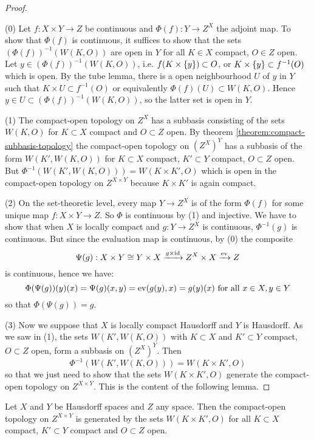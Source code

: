 \begin{proof}\ 

(0) Let $f:X\times Y\to Z$ be continuous and $\Phi(f):Y\to Z^X$ the adjoint map. To show that $\Phi(f)$ is continuous, it suffices to show that the sets $(\Phi(f))^{-1}(W(K,O))$ are open in $Y$ for all $K\in X$ compact, $O\in Z$ open. Let $y\in (\Phi(f))^{-1}(W(K,O))$, i.e. $f(K\times\{y\})\subset O$, or $K\times\{y\}\subset f^{-1}(O)$ which is open. By the tube lemma, there is a open neighbourhood $U$ of $y$ in $Y$ such that $K\times U\subset f^{-1}(O)$ or equivalently $\Phi(f)(U)\subset W(K,O)$. Hence $y\in U\subset(\Phi(f))^{-1}(W(K,O))$, so the latter set is open in $Y$.

(1) The compact-open topology on $Z^X$ has a subbasis consisting of the sets $W(K,O)$ for $K\subset X$ compact and $O\subset Z$ open. By theorem \ref{theorem:compact-subbasis-topology} the compact-open topology on $(Z^X)^Y$ has a subbasis of the form $W(K',W(K,O))$ for $K\subset X$ compact, $K'\subset Y$ compact, $O\subset Z$ open. But $\Phi^{-1}(W(K',W(K,O)))=W(K\times K',O)$ which is open in the compact-open topology on $Z^{X\times Y}$ because $K\times K'$ is again compact.

(2) On the set-theoretic level, every map $Y\to Z^X$ is of the form $\Phi(f)$ for some unique map $f:X\times Y\to Z$. So $\Phi$ is continuous by (1) and injective. We have to show that when $X$ is locally compact and $g:Y\to Z^X$ is continuous, $\Phi^{-1}(g)$ is continuous. But since the evaluation map is continuous, by (0) the composite
\[\Psi(g):X\times Y\cong Y\times X\xrightarrow{g\times\operatorname{id}}Z^X\times X\xrightarrow{\operatorname{ev}}Z\]
is continuous, hence we have:
\[\Phi(\Psi(g))(y)(x)=\Psi(g)(x,y)=\operatorname{ev}(g(y),x)=g(y)(x)\text{ for all }x\in X,y\in Y\]
so that $\Phi(\Psi(g))=g$.

(3) Now we suppose that $X$ is locally compact Hausdorff and $Y$ is Hausdorff. As we saw in (1), the sets $W(K',W(K,O))$ with $K\subset X$ and $K'\subset Y$ compact, $O\subset Z$ open, form a subbasis on $(Z^X)^Y$. Then
\[\Phi^{-1}(W(K',W(K,O)))=W(K\times K',O)\]
so that we just need to show that the sets $W(K\times K',O)$ generate the compact-open topology on $Z^{X\times Y}$. This is the content of the following lemma.
\end{proof}

\begin{lemma}
Let $X$ and $Y$ be Hausdorff spaces and $Z$ any space. Then the compact-open topology on $Z^{X\times Y}$ is generated by the sets $W(K\times K',O)$ for all $K\subset X$ compact, $K'\subset Y$ compact and $O\subset Z$ open.
\end{lemma}

